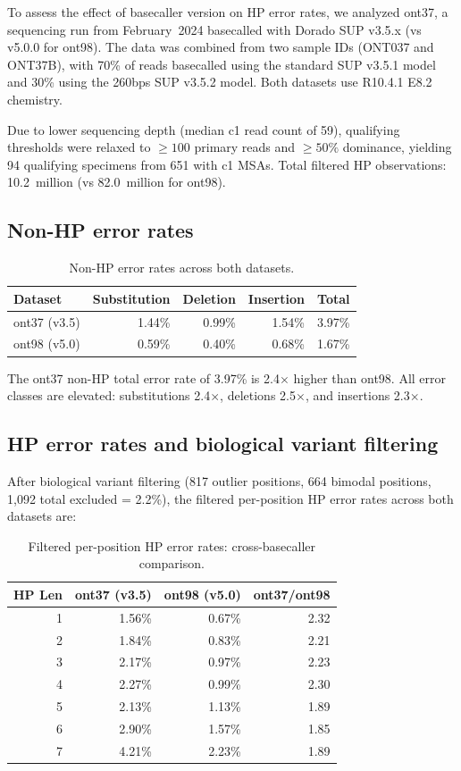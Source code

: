 \documentclass[11pt]{article}
\begin{document}
To assess the effect of basecaller version on HP error rates, we analyzed
ont37, a sequencing run from February~2024 basecalled with Dorado SUP v3.5.x
(vs v5.0.0 for ont98). The data was combined from two sample IDs (ONT037 and
ONT37B), with 70\% of reads basecalled using the standard SUP v3.5.1 model
and 30\% using the 260bps SUP v3.5.2 model. Both datasets use R10.4.1 E8.2
chemistry.

Due to lower sequencing depth (median c1 read count of 59), qualifying
thresholds were relaxed to $\geq 100$ primary reads and $\geq 50\%$ dominance,
yielding 94 qualifying specimens from 651 with c1 MSAs. Total filtered HP
observations: 10.2~million (vs 82.0~million for ont98).

\subsection{Non-HP error rates}

\begin{table}[h]
\centering
\caption{Non-HP error rates across both datasets.}
\label{tab:nonhp_all}
\begin{tabular}{lrrrr}
\toprule
Dataset & Substitution & Deletion & Insertion & Total \\
\midrule
ont37 (v3.5) & 1.44\% & 0.99\% & 1.54\% & 3.97\% \\
ont98 (v5.0) & 0.59\% & 0.40\% & 0.68\% & 1.67\% \\
\bottomrule
\end{tabular}
\end{table}

The ont37 non-HP total error rate of 3.97\% is 2.4$\times$ higher than ont98.
All error classes are elevated: substitutions 2.4$\times$, deletions
2.5$\times$, and insertions 2.3$\times$.

\subsection{HP error rates and biological variant filtering}

After biological variant filtering (817 outlier positions, 664 bimodal
positions, 1,092 total excluded = 2.2\%), the filtered per-position HP error
rates across both datasets are:

\begin{table}[h]
\centering
\caption{Filtered per-position HP error rates: cross-basecaller comparison.}
\label{tab:three_run}
\begin{tabular}{rrrr}
\toprule
HP Len & ont37 (v3.5) & ont98 (v5.0) & ont37/ont98 \\
\midrule
1 & 1.56\% & 0.67\% & 2.32 \\
2 & 1.84\% & 0.83\% & 2.21 \\
3 & 2.17\% & 0.97\% & 2.23 \\
4 & 2.27\% & 0.99\% & 2.30 \\
5 & 2.13\% & 1.13\% & 1.89 \\
6 & 2.90\% & 1.57\% & 1.85 \\
7 & 4.21\% & 2.23\% & 1.89 \\
\bottomrule
\end{tabular}
\end{table}
\end{document}
